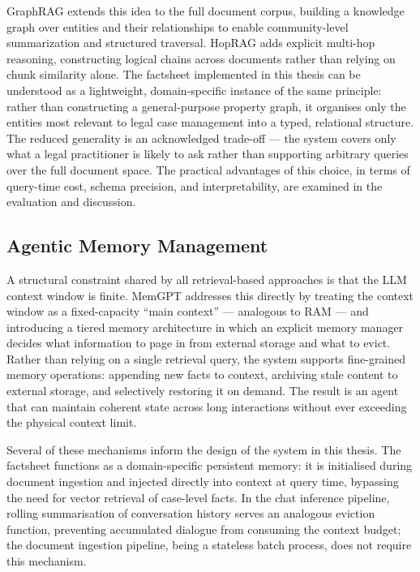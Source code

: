 GraphRAG \cite{edge2025localglobalgraphrag} extends this idea to the full document corpus, building a knowledge graph over entities and their relationships to enable community-level summarization and structured traversal. HopRAG \cite{liu2025hoprag} adds explicit multi-hop reasoning, constructing logical chains across documents rather than relying on chunk similarity alone. The factsheet implemented in this thesis can be understood as a lightweight, domain-specific instance of the same principle: rather than constructing a general-purpose property graph, it organises only the entities most relevant to legal case management into a typed, relational structure. The reduced generality is an acknowledged trade-off --- the system covers only what a legal practitioner is likely to ask rather than supporting arbitrary queries over the full document space. The practical advantages of this choice, in terms of query-time cost, schema precision, and interpretability, are examined in the evaluation and discussion.

\subsection{Agentic Memory Management}

A structural constraint shared by all retrieval-based approaches is that the LLM context window is finite. MemGPT \cite{packer2024memgptllmsoperatingsystems} addresses this directly by treating the context window as a fixed-capacity ``main context'' --- analogous to RAM --- and introducing a tiered memory architecture in which an explicit memory manager decides what information to page in from external storage and what to evict. Rather than relying on a single retrieval query, the system supports fine-grained memory operations: appending new facts to context, archiving stale content to external storage, and selectively restoring it on demand. The result is an agent that can maintain coherent state across long interactions without ever exceeding the physical context limit.

Several of these mechanisms inform the design of the system in this thesis. The factsheet functions as a domain-specific persistent memory: it is initialised during document ingestion and injected directly into context at query time, bypassing the need for vector retrieval of case-level facts. In the chat inference pipeline, rolling summarisation of conversation history serves an analogous eviction function, preventing accumulated dialogue from consuming the context budget; the document ingestion pipeline, being a stateless batch process, does not require this mechanism.

